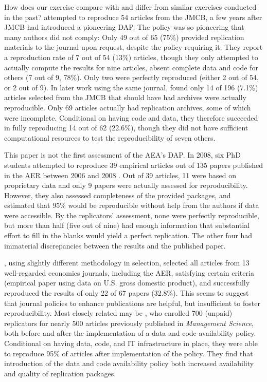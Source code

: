 \documentclass{cje} %
\theoremstyle{plain}%
\theoremstyle{definition}
\theoremstyle{remark}
\begin{document}
How does our exercise compare with and differ from similar exercises conducted in the past? 
\cite{Dewald1986} attempted to reproduce 54 articles from the \ac{JMCB}, a few years after \ac{JMCB} had introduced a pioneering DAP. The policy was so pioneering that many authors did not comply: Only 49 out of 65 (75\%) provided replication materials to the journal upon request, despite the policy requiring it. They report a reproduction rate of  7 out of 54 (13\%) articles, though they only attempted to actually compute the results for nine articles, absent complete data and code for others (7 out of 9, 78\%). Only two were perfectly reproduced (either 2 out of 54, or 2 out of 9). In later work using the same journal, \cite{McCullough2006} found only 14 of 196 (7.1\%) articles selected from the \ac{JMCB} that should have had archives were actually reproducible. Only 69 articles actually had replication archives, some of which were incomplete. Conditional on having code and data, they therefore succeeded in fully reproducing 14 out of 62 (22.6\%), though they did not have sufficient computational resources to test the reproducibility of seven others.

This paper is not the first assessment of the AEA's DAP. In 2008, six PhD students attempted to reproduce 39 empirical articles out of 135  papers published in the AER between 2006 and 2008 \citep{Glandon2010}. Out of 39 articles, 11 were based on proprietary data and only 9 papers were actually assessed for reproducibility. However, they also assessed completeness of the provided packages, and estimated that 95\% would be reproducible without help from the authors if data were accessible. By the replicators' assessment, none were perfectly reproducible, but more than half (five out of nine) had enough information that substantial effort to fill in the blanks would yield a perfect replication. The other four had immaterial discrepancies between the results and the published paper. 

\cite{ChangLi2015}, using slightly different methodology in selection, selected all articles from 13 well-regarded economics journals, including the AER, satisfying certain criteria (empirical paper using data on U.S. gross domestic product), and successfully reproduced the results of only 22 of 67 papers (32.8\%). This seems to suggest that journal policies to enhance publications are helpful, but insufficient to foster reproducibility. Most closely related may be \cite{greiner2023}, who enrolled 700 (unpaid) replicators for nearly 500 articles previously published in \textit{Management Science}, both before and after the implementation of a data and code availability policy. Conditional on having data, code, and IT infrastructure in place, they were able to reproduce 95\% of articles after implementation of the policy. They find that introduction of the data and code availability policy both increased availability and quality of replication packages. 
\end{document}
